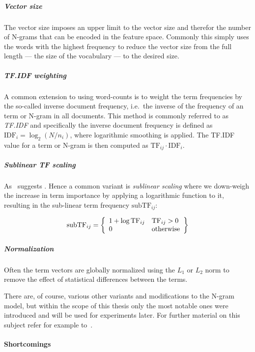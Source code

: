 \subparagraph{Vector size} The vector size imposes an upper limit to the vector size and therefor the number of N-grams that can be encoded in the feature space. Commonly this simply uses the words with the highest frequency to reduce the vector size from the full length --- the size of the vocabulary --- to the desired size.

\subparagraph{TF.IDF weighting}
\label{subp:TF.IDF weighting}
A common extension to using word-counts is to weight the term frequencies by the so-called inverse document frequency, i.e.\ the inverse of the frequency of an term or N-gram in all documents. This method is commonly referred to as \emph{TF.IDF} and specifically the inverse document frequency is defined as $\text{IDF}_i = \log_2 (N/n_i)$, where logarithmic smoothing is applied. The TF.IDF value for a term or N-gram is then computed as $\text{TF}_{ij} \cdot \text{IDF}_i$.

\subparagraph{Sublinear TF scaling}
\label{subp:Sublinear TF scaling}
 As~\cite[Chapter 6.4.1, p.~126]{Manning:2008aa} suggests . Hence a common variant is \emph{sublinear scaling} where we down-weigh the increase in term importance by applying a logarithmic function to it, resulting in the sub-linear term frequency $\text{subTF}_{ij}$:

\begin{displaymath}
  \text{subTF}_{ij} = \left \{ \begin{array}{l l} 1+\log \text{TF}_{ij} & \text{TF}_{ij} > 0 \\
  0 & \text{otherwise}
\end{array} \right \}
\end{displaymath}

\subparagraph{Normalization} Often the term vectors are globally normalized using the $L_1$ or $L_2$ norm to remove the effect of statistical differences between the terms.

There are, of course, various other variants and modifications to the N-gram model, but within the scope of this thesis only the most notable ones were introduced and will be used for experiments later. For further material on this subject refer for example to~\cite{Manning:2008aa}.


\paragraph{Shortcomings}
\label{subs:shortcomings-ngrams}

